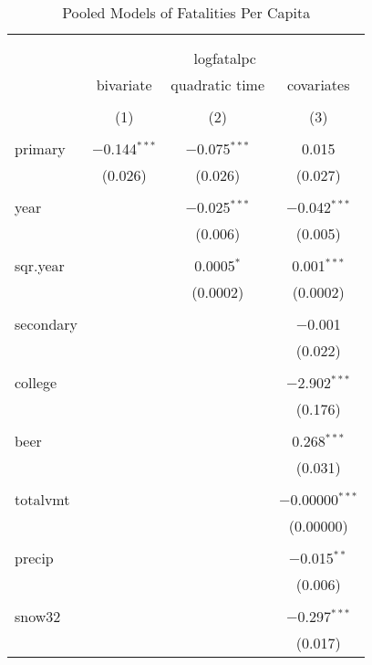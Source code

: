 \documentclass{article}
\begin{document}
\begin{table}[!htbp] \centering 
  \caption{Pooled Models of Fatalities Per Capita} 
  \label{tab:3a} 
\footnotesize 
\begin{tabular}{@{\extracolsep{5pt}}lccc} 
\\[-1.8ex]\hline 
\hline \\[-1.8ex] 
\\[-1.8ex] & \multicolumn{3}{c}{logfatalpc} \\ 
 & bivariate & quadratic time & covariates \\ 
\\[-1.8ex] & (1) & (2) & (3)\\ 
\hline \\[-1.8ex] 
 primary & $-$0.144$^{***}$ & $-$0.075$^{***}$ & 0.015 \\ 
  & (0.026) & (0.026) & (0.027) \\ 
  & & & \\ 
 year &  & $-$0.025$^{***}$ & $-$0.042$^{***}$ \\ 
  &  & (0.006) & (0.005) \\ 
  & & & \\ 
 sqr.year &  & 0.0005$^{*}$ & 0.001$^{***}$ \\ 
  &  & (0.0002) & (0.0002) \\ 
  & & & \\ 
 secondary &  &  & $-$0.001 \\ 
  &  &  & (0.022) \\ 
  & & & \\ 
 college &  &  & $-$2.902$^{***}$ \\ 
  &  &  & (0.176) \\ 
  & & & \\ 
 beer &  &  & 0.268$^{***}$ \\ 
  &  &  & (0.031) \\ 
  & & & \\ 
 totalvmt &  &  & $-$0.00000$^{***}$ \\ 
  &  &  & (0.00000) \\ 
  & & & \\ 
 precip &  &  & $-$0.015$^{**}$ \\ 
  &  &  & (0.006) \\ 
  & & & \\ 
 snow32 &  &  & $-$0.297$^{***}$ \\ 
  &  &  & (0.017) \\ 

\end{tabular}
\end{table}
\end{document}
